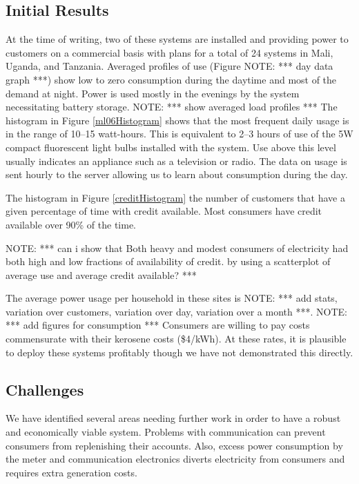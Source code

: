 \documentclass[conference]{IEEEtran}
\newcommand{\note}[1]{{\color{red} NOTE: *** #1 ***}}
\begin{document}


\subsection{Initial Results}
At the time of writing, two of these systems are installed and providing
power to customers on a commercial basis with plans for a total of 
24 systems in Mali, Uganda, and Tanzania.
Averaged profiles of use 
(Figure \note{day data graph}) show low to zero consumption during the 
daytime and most of the demand at night.   
Power is used mostly in
the evenings by the system necessitating battery storage. 
\note{show averaged load profiles}
The histogram in Figure \ref{ml06Histogram} shows that the most frequent
daily usage is in the range of 10--15 watt-hours.  
This is equivalent to 2--3 hours of use of the 5W compact fluorescent 
light bulbs installed with the system.  
Use above this level usually indicates an appliance such as a television
or radio.
% 
The data on usage is sent hourly to the server allowing us
to learn about consumption during the day.  

The histogram in Figure \ref{creditHistogram} the number of customers that have
a given percentage of time with credit available.  
Most consumers have credit available over 90\% of the time.

\note{ can i show that Both heavy and
modest consumers of electricity had both high and low fractions of availability
of credit. by using a scatterplot of average use and average credit available?}
 
The average power usage per
household in these sites is \note{add stats, variation over customers, 
variation over day, variation over a month}.  \note{add figures
for consumption}  Consumers are willing to pay costs commensurate with their 
kerosene costs (\$4/kWh).  At these rates, it is plausible to deploy these
systems profitably though we have not demonstrated this directly.

\subsection{Challenges}
We have identified several areas needing further work in order to have 
a robust and economically viable system.  Problems with communication
can prevent consumers from replenishing their accounts.  Also, excess
power consumption by the meter and communication electronics diverts 
electricity from consumers and requires extra generation costs.
\end{document}
